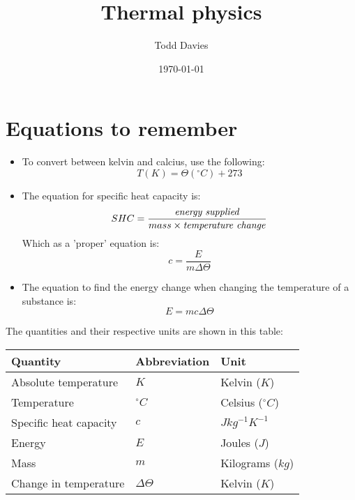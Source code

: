 \documentclass{article}
\title{Thermal physics}
\author{Todd Davies}
\date{\today}
\begin{document}
\lhead{\today}

\maketitle

\section*{Equations to remember}
\begin{itemize}
	\item To convert between kelvin and calcius, use the following:
	\[
		T(K) = \Theta(^\circ C) + 273
	\]
	\item The equation for specific heat capacity is:
	\[
		SHC = \frac{\textrm{\textit{energy supplied}}}{mass \times \textrm{\textit{temperature change}}}
	\]
	Which as a 'proper' equation is:
	\[
		c = \frac{E}{m \Delta \Theta}
	\]
	\item The equation to find the energy change when changing the temperature of a substance is:
	\[
		E = mc \Delta \Theta
	\]
\end{itemize}

The quantities and their respective units are shown in this table:

\begin{center}
	\begin{tabular}{|l|l|l|}
		\hline
			Quantity & Abbreviation & Unit \\ \hline
			Absolute temperature & $K$ & Kelvin ($K$) \\ \hline
			Temperature & $^\circ C$ & Celsius ($^\circ C$) \\ \hline
			Specific heat capacity & $c$ & $Jkg^{-1}K^{-1}$ \\ \hline
			Energy & $E$ & Joules ($J$)\\ \hline
			Mass & $m$ & Kilograms ($kg$)\\ \hline
			Change in temperature & $\Delta \Theta$ & Kelvin ($K$) \\ \hline
	\end{tabular}
\end{center}
\end{document}
